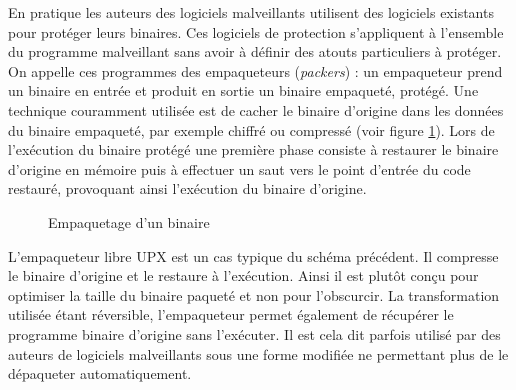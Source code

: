 En pratique les auteurs des logiciels malveillants utilisent des logiciels existants pour protéger leurs binaires.
Ces logiciels de protection s'appliquent à l'ensemble du programme malveillant sans avoir à définir des atouts particuliers à protéger. On appelle ces programmes des empaqueteurs (\emph{packers}) : un empaqueteur prend un binaire en entrée et produit en sortie un binaire empaqueté, protégé. Une technique couramment utilisée est de cacher le binaire d'origine dans les données du binaire empaqueté, par exemple chiffré ou compressé (voir figure \ref{fig:packer}). Lors de l'exécution du binaire protégé une première phase consiste à restaurer le binaire d'origine en mémoire puis à effectuer un saut vers le point d'entrée du code restauré, provoquant ainsi l'exécution du binaire d'origine.

\begin{figure}
\begin{center}
\end{center}
\caption{Empaquetage d'un binaire}
\label{fig:packer}
\end{figure}

L'empaqueteur libre UPX \cite{UPX} est un cas typique du schéma précédent. Il compresse le binaire d'origine et le restaure à l'exécution. Ainsi il est plutôt conçu pour optimiser la taille du binaire paqueté et non pour l'obscurcir. La transformation utilisée étant réversible, l'empaqueteur permet également de récupérer le programme binaire d'origine sans l'exécuter. Il est cela dit parfois utilisé par des auteurs de logiciels malveillants sous une forme modifiée ne permettant plus de le dépaqueter automatiquement.


